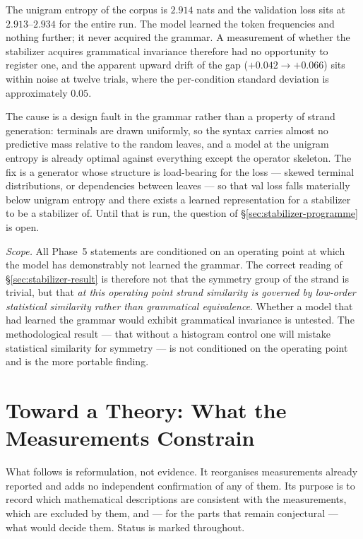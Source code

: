 \begin{observation}
\label{obs:sweep-null}
The unigram entropy of the corpus is $2.914$ nats and the validation loss sits
at $2.913$--$2.934$ for the entire run. The model learned the token frequencies
and nothing further; it never acquired the grammar. A measurement of whether
the stabilizer acquires grammatical invariance therefore had no opportunity to
register one, and the apparent upward drift of the gap
($+0.042\to+0.066$) sits within noise at twelve trials, where the per-condition
standard deviation is approximately $0.05$.
\end{observation}

The cause is a design fault in the grammar rather than a property of strand
generation: terminals are drawn uniformly, so the syntax carries almost no
predictive mass relative to the random leaves, and a model at the unigram
entropy is already optimal against everything except the operator skeleton. The
fix is a generator whose structure is load-bearing for the loss --- skewed
terminal distributions, or dependencies between leaves --- so that val loss
falls materially below unigram entropy and there exists a learned
representation for a stabilizer to be a stabilizer of. Until that is run, the
question of \S\ref{sec:stabilizer-programme} is open.

\emph{Scope.} All Phase~5 statements are conditioned on an operating point at
which the model has demonstrably not learned the grammar. The correct reading
of \S\ref{sec:stabilizer-result} is therefore not that the symmetry group of
the strand is trivial, but that \emph{at this operating point strand similarity
is governed by low-order statistical similarity rather than grammatical
equivalence}. Whether a model that had learned the grammar would exhibit
grammatical invariance is untested. The methodological result ---
that without a histogram control one will mistake statistical similarity for
symmetry --- is not conditioned on the operating point and is the more portable
finding.

\section{Toward a Theory: What the Measurements Constrain}
\label{sec:theory}

What follows is reformulation, not evidence. It reorganises measurements
already reported and adds no independent confirmation of any of them. Its
purpose is to record which mathematical descriptions are consistent with the
measurements, which are excluded by them, and --- for the parts that remain
conjectural --- what would decide them. Status is marked throughout.

